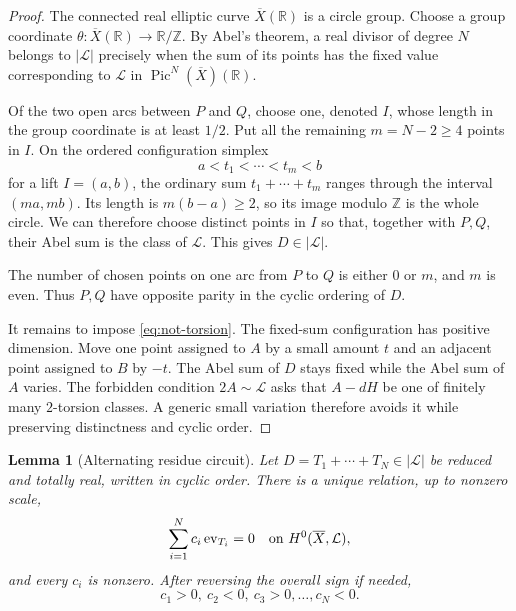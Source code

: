\documentclass[11pt]{article}
\newtheorem{lemma}{Lemma}
\newcommand{\R}{\mathbb{R}}
\newcommand{\cL}{\mathcal{L}}
\newcommand{\ev}{\operatorname{ev}}
\newcommand{\Pic}{\operatorname{Pic}}
\begin{document}
\begin{proof}
The connected real elliptic curve $\overline X(\R)$ is a circle group.
Choose a group coordinate
$\theta:\overline X(\R)\to\R/\mathbb Z$. By Abel's theorem, a real divisor
of degree $N$ belongs to $|\cL|$ precisely when the sum of its points has
the fixed value corresponding to $\cL$ in
$\Pic^N(\overline X)(\R)$.

Of the two open arcs between $P$ and $Q$, choose one, denoted $I$, whose
length in the group coordinate is at least $1/2$. Put all the remaining
$m=N-2\geq4$ points in $I$. On the ordered configuration simplex
\[
 a<t_1<\cdots<t_m<b
\]
for a lift $I=(a,b)$, the ordinary sum $t_1+\cdots+t_m$ ranges through
the interval $(ma,mb)$. Its length is
$m(b-a)\geq2$, so its image modulo $\mathbb Z$ is the whole circle.
We can therefore choose distinct points in $I$ so that, together with
$P,Q$, their Abel sum is the class of $\cL$. This gives $D\in|\cL|$.

The number of chosen points on one arc from $P$ to $Q$ is either $0$ or
$m$, and $m$ is even. Thus $P,Q$ have opposite parity in the cyclic
ordering of $D$.

It remains to impose \eqref{eq:not-torsion}. The fixed-sum configuration
has positive dimension. Move one point assigned to $A$ by a small amount
$t$ and an adjacent point assigned to $B$ by $-t$. The Abel sum of $D$
stays fixed while the Abel sum of $A$ varies. The forbidden condition
$2A\sim\cL$ asks that $A-dH$ be one of finitely many $2$-torsion
classes. A generic small variation therefore avoids it while preserving
distinctness and cyclic order.
\end{proof}

\begin{lemma}[Alternating residue circuit]\label{lem:residue}
Let $D=T_1+\cdots+T_N\in|\cL|$ be reduced and totally real, written in
cyclic order. There is a unique relation, up to nonzero scale,
\[
 \sum_{i=1}^{N}c_i\ev_{T_i}=0
 \quad\hbox{on }H^0(\overline X,\cL),
\]
and every $c_i$ is nonzero. After reversing the overall sign if needed,
\[
 c_1>0,\ c_2<0,\ c_3>0,\ldots,c_N<0.
\]
\end{lemma}
\end{document}
